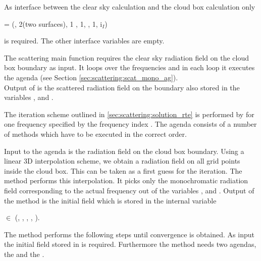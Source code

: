 As interface between the clear sky calculation and the cloud box calculation only 
  \begin{center}
   =  (\Frq, 2(two surfaces), 1 , 1, \ScaZa,
1, i$_I$)
\end{center}
is required. The other interface variables are empty. 

\label{sec:scattering:main_function}

The scattering main function  requires the clear sky radiation 
field on the cloud box boundary as input.
It loops over the frequencies and in each loop it executes the agenda 
(see Section \ref{sec:scattering:scat_mono_ag}).\\
Output of  is the scattered radiation field on the
boundary also stored in the variables ,  and
.

\label{sec:scattering:scat_mono_ag}

The iteration scheme outlined in \ref{sec:scattering:solution_rte} is
performed by  for one frequency specified
by the frequency index . 
The agenda consists of a number of methods which have to be executed in
the correct order.


Input to the agenda is the radiation field on the cloud
box boundary.
Using a linear 3D interpolation scheme, we obtain a
radiation field on all grid points inside the cloud box.
This can be taken as a first guess for the iteration. The method
 performs this
interpolation. It picks only the monochromatic radiation field
corresponding to the actual frequency out of the variables
,  and
. Output of the method is the initial field 
which is stored in the internal variable
\begin{center}
   $\in$ (\Prs, \Lat, \Lon, \ScaZa,
\ScaAa). 
\end{center}


The method  performs the following steps 
until convergence is obtained. As input the initial field stored in
 is required. Furthermore the method needs two
agendas, the  and the
.

